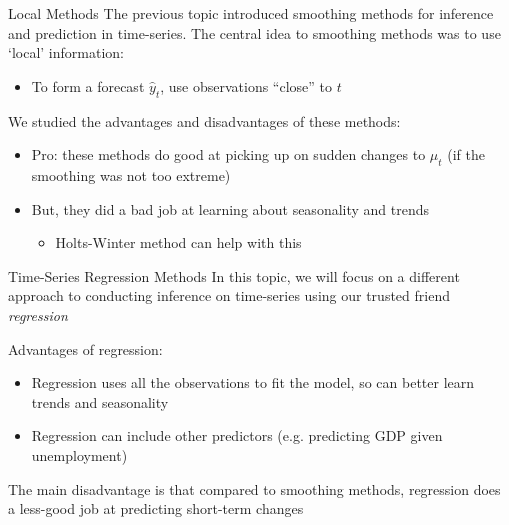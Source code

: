 \documentclass[aspectratio=169,t,11pt,table]{beamer}
\begin{document}
\begin{frame}{Local Methods}
  The previous topic introduced smoothing methods for inference and prediction in time-series. The central idea to smoothing methods was to use `local' information:
  \begin{itemize}
    \item To form a forecast $\hat{y}_t$, use observations ``close'' to $t$
  \end{itemize}

  \bigskip
  We studied the advantages and disadvantages of these methods: 
  \begin{itemize}
    \item Pro: these methods do good at picking up on sudden changes to $\mu_t$ (if the smoothing was not too extreme)

    \item But, they did a bad job at learning about seasonality and trends
    \begin{itemize}
      \item Holts-Winter method can help with this
    \end{itemize}
  \end{itemize}
\end{frame}

\begin{frame}{Time-Series Regression Methods}
  In this topic, we will focus on a different approach to conducting inference on time-series using our trusted friend \emph{regression}

  \bigskip
  Advantages of regression:
  \begin{itemize}
    \item Regression uses all the observations to fit the model, so can better learn trends and seasonality
    
    \item Regression can include other predictors (e.g. predicting GDP given unemployment)
  \end{itemize}

  \bigskip
  The main disadvantage is that compared to smoothing methods, regression does a less-good job at predicting short-term changes 
\end{frame}
\end{document}
